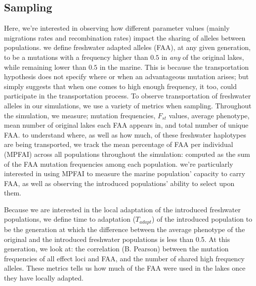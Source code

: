 \documentclass{article}
\begin{document}






\subsection{Sampling}


Here, we're interested in observing how different parameter values
(mainly migrations rates and recombination rates)
impact the sharing of alleles between populations. 
we define freshwater adapted alleles (FAA),
at any given generation,
to be a mutations with a frequency higher than $0.5$ in \textit{any} of the original lakes, 
while remaining lower than $0.5$ in the marine. 
This is because the transportation hypothesis does not specify where or when an advantageous mutation arises; 
but simply suggests that when one comes to high enough frequency, it too, could participate in the transportation process. \cite{Schluter2009}
To observe transportation of freshwater alleles in our simulations, we use a variety of metrics when sampling.
Throughout the simulation, we measure;
mutation frequencies, 
$F_{st}$ values, 
average phenotype, 
mean number of original lakes each FAA appears in,
and total number of unique FAA. 
to understand where, as well as how much, of these freshwater haplotypes are being transported,
we track the mean percentage of FAA per individual (MPFAI) across all populations throughout the simulation:
computed as the sum of the FAA mutation frequencies among each population.
we're particularly interested in using MPFAI to measure the marine population' capacity to carry FAA,
as well as observing the introduced populations' ability to select upon them. 

Because we are interested in the local adaptation of the introduced freshwater populations,
we define time to adaptation ($T_{adapt}$) of the introduced population to be the generation at which
the difference between the average phenotype of the original and the introduced freshwater populations is less than 0.5. 
At this generation, we look at:
the correlation (B. Pearson) between the mutation frequencies of all effect loci and FAA,
and the number of shared high frequency alleles. 
These metrics tells us how much of the FAA  were used in the lakes once they have locally adapted. 
\end{document}
